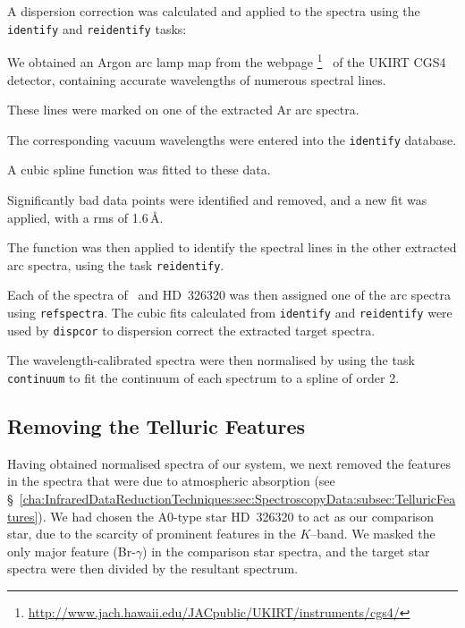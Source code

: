 \vspace{\myparskip}

A dispersion correction was calculated and applied to the spectra using the \texttt{identify} and \texttt{reidentify} tasks: %
\begin{inparaenum}[(i)]
\item
We obtained an Argon arc lamp map from the webpage%
\footnote{\label{cha:AccretionDiskContamination:sec:Spectroscopy:subsec:InitialReduction:foot:CGS4}
\url{http://www.jach.hawaii.edu/JACpublic/UKIRT/instruments/cgs4/} }%
\ of the UKIRT CGS4 detector, containing accurate wavelengths of
numerous spectral lines.
\item
These lines were marked on one of the
extracted Ar arc spectra.
\item
The corresponding vacuum wavelengths were
entered into the \texttt{identify} database.
\item
A cubic spline function
was fitted to these data.
\item
Significantly bad data points
were identified and removed, and a new fit was applied, with a rms of
1.6\,\AA.\@
\item The function was then applied to identify the spectral lines in the other
extracted arc spectra, using the task \texttt{reidentify}. %
\end{inparaenum}

\vspace{\myparskip}

Each of the spectra of \groj\ and \mbox{HD 326320}
was then assigned one of the arc spectra using
\texttt{refspectra}. The cubic fits calculated from \texttt{identify}
and \texttt{reidentify} were used by \texttt{dispcor} to dispersion
correct the extracted target spectra. %

\vspace{\myparskip}

The wavelength-calibrated spectra were then normalised by using the
task \texttt{continuum} to fit the continuum of each spectrum to a
spline of order 2. %


\subsection{Removing the Telluric Features}\label{cha:AccretionDiskContamination:sec:Spectroscopy:subsec:TelluricFeatures}

Having obtained normalised spectra of our system, we next removed the features in the spectra that were due to atmospheric absorption (see \S~\ref{cha:InfraredDataReductionTechniques:sec:SpectroscopyData:subsec:TelluricFeatures}). We had chosen the A0-type star \mbox{HD 326320} to act as our comparison star, due to the scarcity of prominent features in the $K$--band. We masked the only major feature (Br-$\gamma$) in the comparison star spectra, and the target star spectra were then divided by the
resultant spectrum. %

